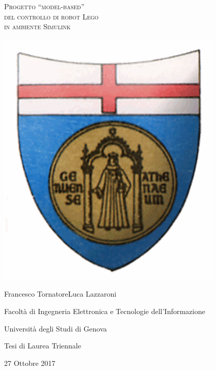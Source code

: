\begin{titlepage}
\thispagestyle{empty}
\centering
\begin{center}
	\begin{Huge}
		\textsc{Progetto ``model-based''\\
			del controllo di robot Lego\\
			in ambiente Simulink\\}
	\end{Huge}
\end{center}
\vfill
\vfill
\vfill
\begin{center}
	\includegraphics[scale=0.35]{logo_unige.png}
\end{center}
\vfill
\vfill
\vfill
\begin{center}
	{\LARGE Francesco Tornatore\quad Luca Lazzaroni}
\end{center}
\vfill
\begin{center}
	{\Large Facoltà di Ingegneria Elettronica e Tecnologie dell'Informazione}
\end{center}
\begin{center}
	{\Large Università degli Studi di Genova}	
\end{center}
\vfill

\begin{center}
	{\large Tesi di Laurea Triennale}
\end{center}
\begin{center}
	{\large 27 Ottobre 2017}
\end{center}
\vfill
\end{titlepage}